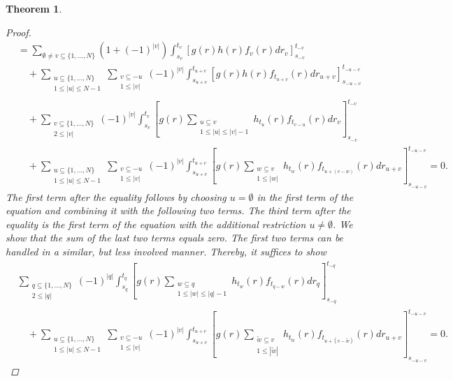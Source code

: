 \documentclass[english, a4paper, 12pt,reqno]{amsart}
\newtheorem{theorem}[defi]{Theorem}
\begin{document}
\begin{theorem}
\begin{proof}
\begin{equation*}
\begin{split}
&= \sum_{\emptyset\neq v \subseteq \{1,\dots,N\}}(1+(-1)^{|v|}) \int_{s_v}^{t_v} [g(r)h(r)f_v(r) dr_v]_{s_{-v}}^{t_{-v}}\\
&\quad+ \sum_{\substack{u\subseteq\{1,\dots,N\}\\
1 \leq |u|\leq N-1}} \sum_{\substack{v\subseteq -u\\ 1\leq |v|}} (-1)^{|v|} \int_{s_{u+v}}^{t_{u+v}} \left[g(r) h(r) f_{t_{u+v}}(r) dr_{u+v}\right]_{s_{-u-v}}^{t_{-u-v}}\\
&\quad+ \sum_{\substack{v\subseteq \{1,\dots,N\} \\ 2 \leq |v|}}(-1)^{|v|} \int_{s_v}^{t_v} [g(r)\sum_{\substack{u\subseteq v\\ 1\leq |u| \leq |v|-1}}h_{t_u}(r)f_{t_{v-u}}(r) dr_v]_{s_{-v}}^{t_{-v}}\\
&\quad+ \sum_{\substack{u\subseteq\{1,\dots,N\}\\
1 \leq |u|\leq N-1}} \sum_{\substack{v\subseteq -u\\ 1\leq |v|}} (-1)^{|v|} \int_{s_{u+v}}^{t_{u+v}} \left[g(r) \sum_{\substack{w\subseteq v\\1\leq |w|}} h_{t_w}(r) f_{t_{u+(v-w)}}(r) dr_{u+v}\right]_{s_{-u-v}}^{t_{-u-v}} =0.
\end{split}
\end{equation*}
The first term after the equality follows by choosing $u = \emptyset$ in the first term of the equation and combining it with the following two terms. The third term after the equality is the first term of the equation with the additional restriction $u \neq \emptyset$. 
We show that the sum of the last two terms equals zero. The first two terms can be handled in a similar, but less involved manner. Thereby, it suffices to show
\begin{equation}
\label{zero}
\begin{split}
&\sum_{\substack{q\subseteq \{1,\dots,N\} \\ 2 \leq |q|}}(-1)^{|q|} \int_{s_q}^{t_q} [g(r)\sum_{\substack{w\subseteq q\\ 1\leq |w| \leq |q|-1}}h_{t_w}(r)f_{t_{q-w}}(r) dr_q]_{s_{-q}}^{t_{-q}}\\
&\quad+ \sum_{\substack{u\subseteq\{1,\dots,N\}\\
1 \leq |u|\leq N-1}} \sum_{\substack{v\subseteq -u\\ 1\leq |v|}} (-1)^{|v|} \int_{s_{u+v}}^{t_{u+v}} \left[g(r) \sum_{\substack{\tilde{w}\subseteq v\\1\leq |\tilde{w}|}} h_{t_{\tilde{w}}}(r) f_{t_{u+(v-\tilde{w})}}(r) dr_{u+v}\right]_{s_{-u-v}}^{t_{-u-v}} = 0.

\end{split}
\end{equation}
\end{proof}
\end{theorem}
\end{document}
